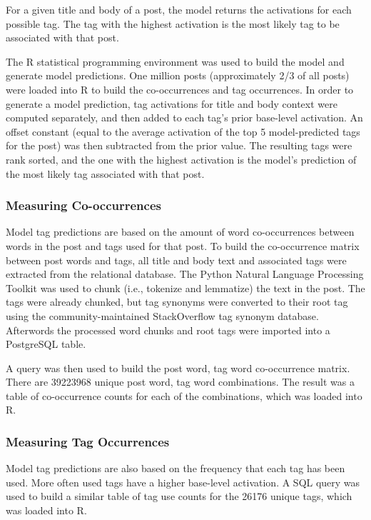 \documentclass[10pt,letterpaper]{article}
\begin{document}
For a given title and body of a post, the model returns the activations for each possible tag.
The tag with the highest activation is the most likely tag to be associated with that post.

The R statistical programming environment was used to build the model and generate model predictions.
One million posts (approximately 2/3 of all posts) were loaded into R to build the co-occurrences and tag occurrences.
In order to generate a model prediction, tag activations for title and body context were computed separately, and then added to each tag's prior base-level activation.
An offset constant (equal to the average activation of the top 5 model-predicted tags for the post) was then subtracted from the prior value.
The resulting tags were rank sorted, and the one with the highest activation is the model's prediction of the most likely tag associated with that post.

\subsubsection{Measuring Co-occurrences}

Model tag predictions are based on the amount of word co-occurrences between words in the post and tags used for that post.
To build the co-occurrence matrix between post words and tags, all title and body text and associated tags were extracted from the relational database.
The Python Natural Language Processing Toolkit \cite{Bird2009} was used to chunk (i.e., tokenize and lemmatize) the text in the post.
The tags were already chunked, but tag synonyms were converted to their root tag using the community-maintained StackOverflow tag synonym database.
Afterwords the processed word chunks and root tags were imported into a PostgreSQL table.

A query was then used to build the post word, tag word co-occurrence matrix.
There are \num{39223968} unique post word, tag word combinations.
The result was a table of co-occurrence counts for each of the combinations, which was loaded into R.

\subsubsection{Measuring Tag Occurrences}

Model tag predictions are also based on the frequency that each tag has been used.
More often used tags have a higher base-level activation.
A SQL query was used to build a similar table of tag use counts for the \num{26176} unique tags, which was loaded into R.
\end{document}
